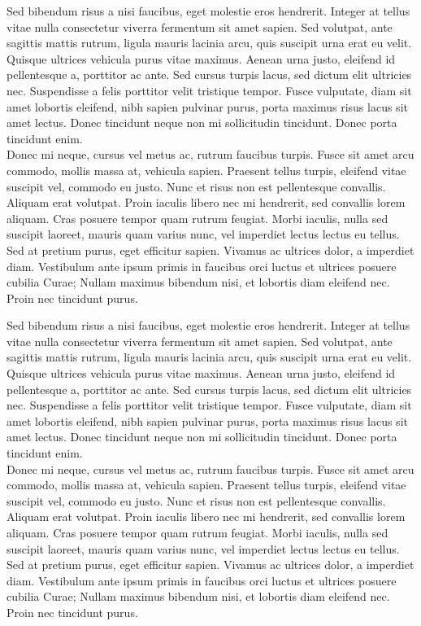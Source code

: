 Sed bibendum risus a nisi faucibus, eget molestie eros hendrerit. Integer at tellus vitae nulla consectetur viverra fermentum sit amet sapien. Sed volutpat, ante sagittis mattis rutrum, ligula mauris lacinia arcu, quis suscipit urna erat eu velit. Quisque ultrices vehicula purus vitae maximus. Aenean urna justo, eleifend id pellentesque a, porttitor ac ante. Sed cursus turpis lacus, sed dictum elit ultricies nec. Suspendisse a felis porttitor velit tristique tempor. Fusce vulputate, diam sit amet lobortis eleifend, nibh sapien pulvinar purus, porta maximus risus lacus sit amet lectus. Donec tincidunt neque non mi sollicitudin tincidunt. Donec porta tincidunt enim.
\\

Donec mi neque, cursus vel metus ac, rutrum faucibus turpis. Fusce sit amet arcu commodo, mollis massa at, vehicula sapien. Praesent tellus turpis, eleifend vitae suscipit vel, commodo eu justo. Nunc et risus non est pellentesque convallis. Aliquam erat volutpat. Proin iaculis libero nec mi hendrerit, sed convallis lorem aliquam. Cras posuere tempor quam rutrum feugiat. Morbi iaculis, nulla sed suscipit laoreet, mauris quam varius nunc, vel imperdiet lectus lectus eu tellus. Sed at pretium purus, eget efficitur sapien. Vivamus ac ultrices dolor, a imperdiet diam. Vestibulum ante ipsum primis in faucibus orci luctus et ultrices posuere cubilia Curae; Nullam maximus bibendum nisi, et lobortis diam eleifend nec. Proin nec tincidunt purus. 


Sed bibendum risus a nisi faucibus, eget molestie eros hendrerit. Integer at tellus vitae nulla consectetur viverra fermentum sit amet sapien. Sed volutpat, ante sagittis mattis rutrum, ligula mauris lacinia arcu, quis suscipit urna erat eu velit. Quisque ultrices vehicula purus vitae maximus. Aenean urna justo, eleifend id pellentesque a, porttitor ac ante. Sed cursus turpis lacus, sed dictum elit ultricies nec. Suspendisse a felis porttitor velit tristique tempor. Fusce vulputate, diam sit amet lobortis eleifend, nibh sapien pulvinar purus, porta maximus risus lacus sit amet lectus. Donec tincidunt neque non mi sollicitudin tincidunt. Donec porta tincidunt enim.
\\

Donec mi neque, cursus vel metus ac, rutrum faucibus turpis. Fusce sit amet arcu commodo, mollis massa at, vehicula sapien. Praesent tellus turpis, eleifend vitae suscipit vel, commodo eu justo. Nunc et risus non est pellentesque convallis. Aliquam erat volutpat. Proin iaculis libero nec mi hendrerit, sed convallis lorem aliquam. Cras posuere tempor quam rutrum feugiat. Morbi iaculis, nulla sed suscipit laoreet, mauris quam varius nunc, vel imperdiet lectus lectus eu tellus. Sed at pretium purus, eget efficitur sapien. Vivamus ac ultrices dolor, a imperdiet diam. Vestibulum ante ipsum primis in faucibus orci luctus et ultrices posuere cubilia Curae; Nullam maximus bibendum nisi, et lobortis diam eleifend nec. Proin nec tincidunt purus. 
\\

